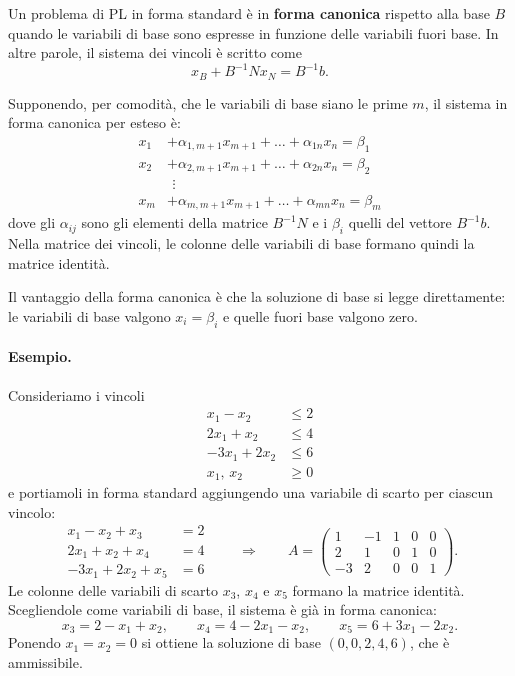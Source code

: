 \begin{definizione}\label{def:canonica}
Un problema di PL in forma standard è in \textbf{forma canonica} rispetto alla base $B$ quando le variabili di base sono espresse in funzione delle variabili fuori base. In altre parole, il sistema dei vincoli è scritto come
\[
x_B + B^{-1} N x_N = B^{-1} b.
\]
\end{definizione}

Supponendo, per comodità, che le variabili di base siano le prime $m$, il sistema in forma canonica per esteso è:
\[
\begin{aligned}
x_1 &+ \alpha_{1,m+1} x_{m+1} + \dots + \alpha_{1n} x_n = \beta_1 \\
x_2 &+ \alpha_{2,m+1} x_{m+1} + \dots + \alpha_{2n} x_n = \beta_2 \\
&\ \,\vdots \\
x_m &+ \alpha_{m,m+1} x_{m+1} + \dots + \alpha_{mn} x_n = \beta_m
\end{aligned}
\]
dove gli $\alpha_{ij}$ sono gli elementi della matrice $B^{-1}N$ e i $\beta_i$ quelli del vettore $B^{-1}b$. Nella matrice dei vincoli, le colonne delle variabili di base formano quindi la matrice identità.

Il vantaggio della forma canonica è che la soluzione di base si legge direttamente: le variabili di base valgono $x_i = \beta_i$ e quelle fuori base valgono zero.

\paragraph{Esempio.}
Consideriamo i vincoli
\[
\begin{aligned}
x_1 - x_2 &\le 2 \\
2x_1 + x_2 &\le 4 \\
-3x_1 + 2x_2 &\le 6 \\
x_1,\, x_2 &\ge 0
\end{aligned}
\]
e portiamoli in forma standard aggiungendo una variabile di scarto per ciascun vincolo:
\[
\begin{aligned}
x_1 - x_2 + x_3 &= 2 \\
2x_1 + x_2 + x_4 &= 4 \\
-3x_1 + 2x_2 + x_5 &= 6
\end{aligned}
\qquad\Longrightarrow\qquad
A = \begin{pmatrix} 1 & -1 & 1 & 0 & 0 \\ 2 & 1 & 0 & 1 & 0 \\ -3 & 2 & 0 & 0 & 1 \end{pmatrix}.
\]
Le colonne delle variabili di scarto $x_3$, $x_4$ e $x_5$ formano la matrice identità. Scegliendole come variabili di base, il sistema è già in forma canonica:
\[
x_3 = 2 - x_1 + x_2, \qquad x_4 = 4 - 2x_1 - x_2, \qquad x_5 = 6 + 3x_1 - 2x_2.
\]
Ponendo $x_1 = x_2 = 0$ si ottiene la soluzione di base $(0, 0, 2, 4, 6)$, che è ammissibile.


